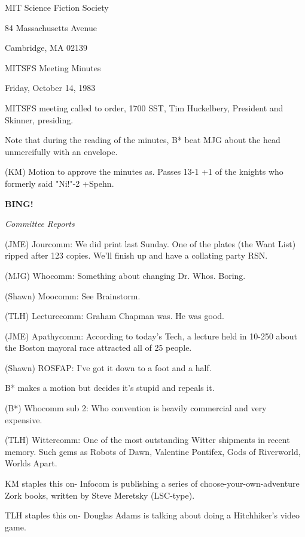 \documentclass[12pt]{article}
\newcommand{\bing}{{\bf BING!} }
\newcommand{\goto}[1]{\bing \vskip 12pt \centerline{{\em{#1}}}}
\begin{document}
\begin{center}

MIT Science Fiction Society 

84 Massachusetts Avenue

Cambridge, MA 02139

\vspace{12pt}

MITSFS Meeting Minutes 

Friday, October 14, 1983

\end{center}
 
\vspace{18pt}

\setlength{\parskip}{6pt}

\noindent
MITSFS meeting called to order, 1700 SST,
Tim Huckelbery, President and Skinner, presiding.

Note that during the reading of the minutes, B* beat MJG about the head unmercifully with an envelope.

(KM) Motion to approve the minutes as. Passes 13-1 +1 of the knights who formerly said "Ni!"-2 +Spehn.

\goto{Committee Reports}

(JME) Jourcomm: We did print last Sunday. One of the plates (the Want List) ripped after 123 copies. We'll finish up and have a collating party RSN.

(MJG) Whocomm: Something about changing Dr. Whos. Boring.

(Shawn) Moocomm: See Brainstorm.

(TLH) Lecturecomm: Graham Chapman was. He was good.

(JME) Apathycomm: According to today's Tech, a lecture held in 10-250 about the Boston mayoral race attracted all of 25 people.

(Shawn) ROSFAP: I've got it down to a foot and a half.

B* makes a motion but decides it's stupid and repeals it.

(B*) Whocomm sub 2: Who convention is heavily commercial and very expensive.

(TLH) Wittercomm: One of the most outstanding Witter shipments in recent memory. Such gems as Robots of Dawn, Valentine Pontifex, Gods of Riverworld, Worlds Apart.

KM staples this on- Infocom is publishing a series of choose-your-own-adventure Zork books, written by Steve Meretsky (LSC-type).

TLH staples this on- Douglas Adams is talking about doing a Hitchhiker's video game.
\end{document}

